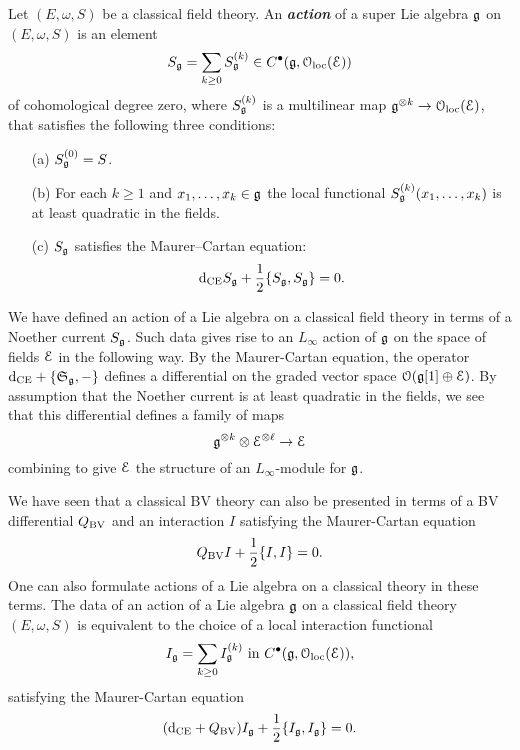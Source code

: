\documentclass[10pt, oneside]{article}
\newcommand{\defterm}[1]{\textbf{\emph{#1}}}
\begin{document}
\begin{definition}
\label{infinitesimal_action_def}
Let $(E, \omega, S)$ be a classical field theory. An \defterm{action} of a super Lie algebra $\mathfrak g$ on $(E, \omega, S)$ is an element 
\[S_\mathfrak g = \sum_{k\geq 0} S_{\mathfrak g}^{(k)}\in C^\bullet(\mathfrak g, \mathcal{O}_{\rm loc}(\mathcal E))\]
of cohomological degree zero, where $S_\mathfrak g^{(k)}$ is a multilinear map $\mathfrak g^{\otimes k} \to \mathcal{O}_{\rm loc}(\mathcal E)$, that satisfies the following three conditions:
\begin{itemize}
\item[(a)] $S_\mathfrak g^{(0)} = S$.
\item[(b)] For each $k \geq 1$ and $x_1, \ldots, x_k \in \mathfrak g$ the local functional $S^{(k)}_\mathfrak g (x_1,\ldots, x_k)$ is at least quadratic in the fields.
\item[(c)] $S_\mathfrak g$ satisfies the Maurer--Cartan equation:
\[{\rm d}_{\mathrm{CE}} S_\mathfrak g + \frac{1}{2} \{S_\mathfrak g, S_\mathfrak g\} = 0.\]
\end{itemize}
\end{definition}

\begin{remark}
We have defined an action of a Lie algebra on a classical field theory in terms of a Noether current $S_\mathfrak g$.
Such data gives rise to an $L_\infty$ action of $\mathfrak g$ on the space of fields $\mathcal E$ in the following way.
By the Maurer-Cartan equation, the operator ${\rm d}_{\mathrm{CE}} + \{\mathfrak S_\mathfrak g, -\}$ 
defines a differential on the graded vector space $\mathcal O(\mathfrak g[1] \oplus \mathcal E)$. 
By assumption that the Noether current is at least quadratic in the fields, we see that this differential defines a family of maps
\[
\mathfrak g^{\otimes k} \otimes \mathcal E^{\otimes \ell} \to \mathcal E
\]
combining to give $\mathcal E$ the structure of an $L_\infty$-module for $\mathfrak g$.
\end{remark}

\begin{remark}
We have seen that a classical BV theory can also be presented in terms of a BV differential $Q_{\mathrm{BV}}$ and an interaction $I$ satisfying the Maurer-Cartan equation
\[Q_{\mathrm{BV}} I + \frac{1}{2} \{I,I\} = 0 .\]
One can also formulate actions of a Lie algebra on a classical theory in these terms. 
The data of an action of a Lie algebra $\mathfrak g$ on a classical field theory $(E, \omega, S)$ is equivalent to the choice of a local interaction functional 
\[I_\mathfrak g = \sum_{k\geq 0} I_{\mathfrak g}^{(k)} \text{ in } C^\bullet(\mathfrak g, \mathcal{O}_{\rm loc}(\mathcal E)),\]
satisfying the Maurer-Cartan equation
\[({\rm d}_{\mathrm{CE}} + Q_{\mathrm{BV}}) I_\mathfrak g + \frac{1}{2} \{I_\mathfrak g, I_\mathfrak g\} = 0.\]
\end{remark}
\end{document}
